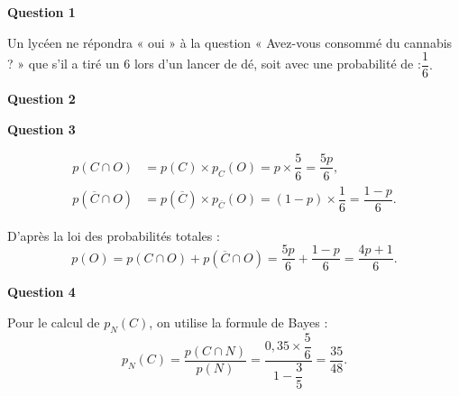 \textbf{Question 1}

Un lycéen ne répondra « oui » à la question « Avez-vous consommé du cannabis ? » que s'il a tiré un 6 lors d'un lancer de dé, soit avec une probabilité de :$\dfrac{1}{6}.
$

\textbf{Question 2}

\begin{center}
\end{center}

\textbf{Question 3}

\begin{align*}
	p(C \cap O) &= p(C) \times p_C(O) = p \times \dfrac{5}{6} = \dfrac{5p}{6}, \\
	p(\overline{C} \cap O) &= p(\overline{C}) \times p_{\overline{C}}(O) = (1 - p) \times \dfrac{1}{6} = \dfrac{1 - p}{6}.
\end{align*}

D'après la loi des probabilités totales :
\[
p(O) = p(C \cap O) + p(\overline{C} \cap O) = \dfrac{5p}{6} + \dfrac{1 - p}{6} = \dfrac{4p + 1}{6}.
\]

\textbf{Question 4}

Pour le calcul de $p_N(C)$, on utilise la formule de Bayes :
\[
p_N(C) = \dfrac{p(C \cap N)}{p(N)} = \dfrac{0,35 \times \dfrac{5}{6}}{1 - \dfrac{3}{5}} = \dfrac{35}{48}.
\]
